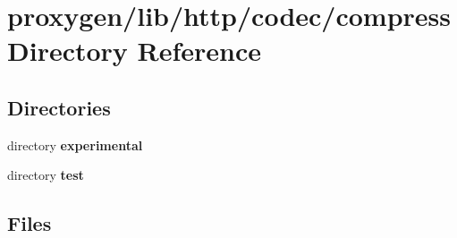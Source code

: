 \section{proxygen/lib/http/codec/compress Directory Reference}
\label{dir_5b6b83f02e88647fa33e02dfd197e4dd}
\subsection*{Directories}
\begin{DoxyCompactItemize}
\item 
directory {\bf experimental}
\item 
directory {\bf test}
\end{DoxyCompactItemize}
\subsection*{Files}
